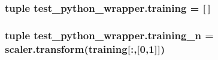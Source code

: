 \subsubsection[{training}]{\setlength{\rightskip}{0pt plus 5cm}tuple test\+\_\+python\+\_\+wrapper.\+training = \mbox{[}$\,$\mbox{]}}\label{namespacetest__python__wrapper_aad910dc42f09fd045947a044950c9472}
\hypertarget{namespacetest__python__wrapper_a077c5501e386c551a0c0f77f9714773d}{}
\subsubsection[{training\+\_\+n}]{\setlength{\rightskip}{0pt plus 5cm}tuple test\+\_\+python\+\_\+wrapper.\+training\+\_\+n = scaler.\+transform({\bf training}\mbox{[}\+:,\mbox{[}0,1\mbox{]}\mbox{]})}\label{namespacetest__python__wrapper_a077c5501e386c551a0c0f77f9714773d}
